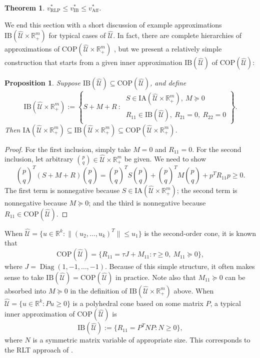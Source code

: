\documentclass[12pt]{article}
\DeclareMathOperator{\Diag}{Diag}
\DeclareMathOperator{\AR}{RLP}
\DeclareMathOperator{\AP}{Aff}
\newtheorem{theorem}{Theorem}
\newtheorem{proposition}{Proposition}
\newcommand{\K}{\widehat{\mathcal{U}}}
\newcommand{\COP}{{\mathrm{COP}}}
\newcommand{\M}{\mathrm{IA}}
\newcommand{\IB}{\mathrm{IB}}
\def\RR{{\mathbb{R}}}
\newcommand{\Q}{{\K \times \RR^m_+}}
\begin{document}
\begin{onehalfspace}
\begin{theorem} \label{theorem:approximaterlp}
$v_{\AR}^* \le v_{\IB}^* \le v_{\AP}^*$.
\end{theorem}

We end this section with a short discussion of example approximations
$\IB(\Q)$ for typical cases of $\K$. In fact, there are complete
hierarchies of approximations of $\COP(\Q)$ \cite{Zuluaga.et.al.2006},
but we present a relatively simple construction that starts from a given
inner approximation $\IB(\K)$ of $\COP(\K)$:

\begin{proposition} %
Suppose $\IB(\K) \subseteq \COP(\K)$, and define
\[
    \IB(\Q) :=
    \left\{
        S + M + R
        \ : \
        \begin{array}{c}
        S \in \M(\Q), \ M \succeq 0 \\
        R_{11} \in \IB(\K), \ R_{21} = 0, \ R_{22} = 0
        \end{array}
    \right\}.
\]
Then $\M(\Q) \subseteq \IB(\Q) \subseteq \COP(\Q)$.
\end{proposition}

\begin{proof}
For the first inclusion, simply take $M = 0$ and $R_{11} = 0$. For the
second inclusion, let arbitrary ${p \choose q} \in \Q$ be given. We need
to show
\[
    {p \choose q}^T
    \left(
        S + M + R
    \right)
    {p \choose q} = \textstyle{{p \choose q}}^T S {p \choose q} +
    \textstyle{{p \choose q}}^T M {p \choose q} + p^T R_{11} p \ge 0.
\]
The first term is nonnegative because $S \in \M(\Q)$; the second
term is nonnegative because $M \succeq 0$; and the third is nonnegative
because $R_{11} \in \COP(\K)$.
\end{proof}

When $\K = \{ u \in \RR^k : \|(u_2, \ldots, u_k)^T\| \le u_1 \}$ is the
second-order cone, it is known \cite{Sturm.Zhang.2003} that
\[
   \COP(\K) = \{ R_{11} = \tau J + M_{11} : \tau \ge 0, \ M_{11} \succeq 0 \},
\]
where $J = \Diag(1, -1, \ldots, -1)$. Because of this simple structure,
it often makes sense to take $\IB(\K) = \COP(\K)$ in practice. Note also
that $M_{11} \succeq 0$ can be absorbed into $M \succeq 0$ in the definition
of $\IB(\Q)$ above. When $\K
= \{ u \in \RR^k: Pu \ge 0 \}$ is a polyhedral cone based on some matrix
$P$, a typical inner approximation of $\COP(\K)$ is
\[
\IB(\K) := \{ R_{11} = P^T N P : N \ge 0 \},
\]
where $N$ is a symmetric matrix variable of appropriate size. This corresponds
to the RLT approach of \cite{Anstreicher.2009, Burer.2015, Sherali.Adams.2013}.


\end{onehalfspace}
\end{document}
